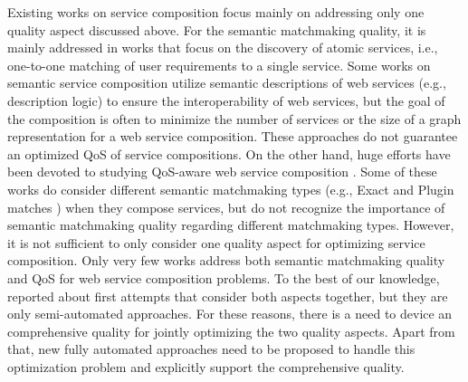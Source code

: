Existing works on service composition focus mainly on addressing only one quality aspect discussed above. For the semantic matchmaking quality, it is mainly addressed in works that focus on the discovery of atomic services, i.e., one-to-one matching of user requirements to a single service. Some works \cite{bansal2016generalized,boustil2014semantic,mier2015integrated} on semantic service composition utilize semantic descriptions of web services (e.g., description logic) to ensure the interoperability of web services, but the goal of the composition is often to minimize the number of services or the size of a graph representation for a web service composition. These approaches do not guarantee an optimized QoS of service compositions. On the other hand, huge efforts have been devoted to studying QoS-aware web service composition \cite{da2015graphevol,da2016particle,gupta2015optimization,ma2015hybrid,qi2010combining,yu2013adaptive}. Some of these works do consider different semantic matchmaking types (e.g., Exact and Plugin matches \cite{paolucci2002semantic}) when they compose services, but do not recognize the importance of semantic matchmaking quality regarding different matchmaking types. However, it is not sufficient to only consider one quality aspect for optimizing service composition. Only very few works address both semantic matchmaking quality and QoS for web service composition problems. To the best of our knowledge, \cite{fanjiang2014semantic,lecue2009optimizing,pop2009immune} reported about first attempts that consider both aspects together, but they are only semi-automated approaches. For these reasons, there is a need to device an comprehensive quality for jointly optimizing the two quality aspects. Apart from that, new fully automated approaches need to be proposed to handle this optimization problem and explicitly support the comprehensive quality. 


